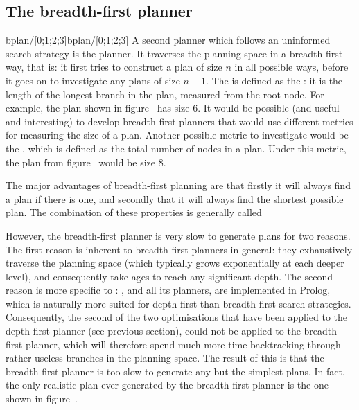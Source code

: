 \subsection {The breadth-first planner}
\begin{predicate}{bplan/[0;1;2;3]}{bplan/[0;1;2;3]}
A second planner which follows an uninformed search strategy is the
 planner. It traverses the planning space in a
breadth-first way, that is: it first tries to construct a plan of
size $n$ in all possible ways, before it goes on to investigate any
plans of size $n+1$. The {\em {}\/}
is defined as the {\em {}}: it is the length of the
longest branch in the plan, measured from the root-node. For example,
the plan shown in figure~ has size 6. It would be
possible (and useful and interesting) to develop breadth-first
planners that would use different metrics for measuring the size of
a plan. Another possible metric to investigate would be the
{\em {}}, which is defined as the total number of
nodes in a plan. Under this metric, the plan from figure~ would be size 8.

The major advantages of breadth-first planning are that firstly it
will always find a plan if there is one, and secondly that it will always find
the shortest possible plan. The combination of these properties is
generally called {\em {}}

However, the breadth-first planner is very slow to generate plans for
two reasons. The first reason is inherent to breadth-first planners in
general: they exhaustively traverse the planning space (which
typically grows exponentially at each deeper level), and consequently
take ages to reach any significant depth. The second reason is more
specific to \clam: \clam, and all its planners, are implemented in
Prolog, which is naturally more suited for depth-first than
breadth-first search strategies. Consequently, the second of the two
optimisations that have been applied to the depth-first planner (see
previous section), could not be applied to the breadth-first planner,
which will therefore spend much more time backtracking through rather
useless branches in the planning space. The result of this is that the
breadth-first planner is too slow to generate any but the simplest
plans. In fact, the only realistic plan ever generated by the
breadth-first planner is the one shown in figure~.
\end{predicate}

